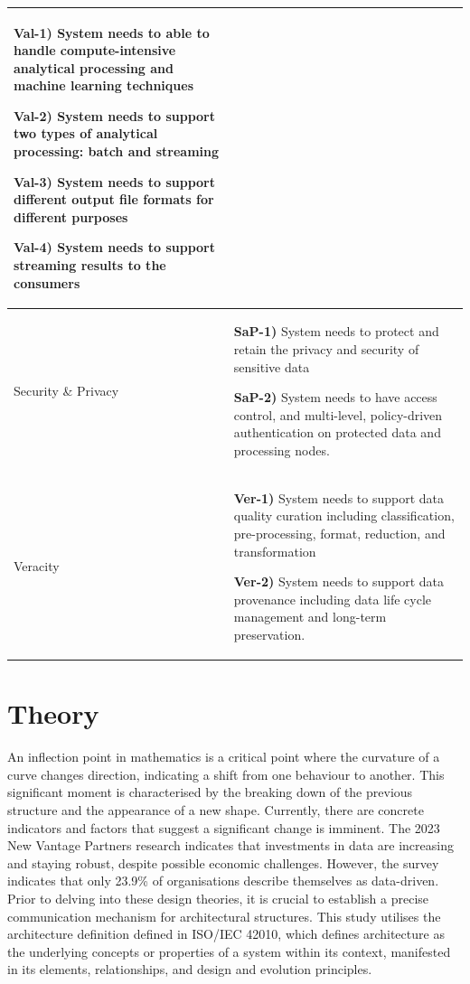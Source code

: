 \documentclass[preprint,12pt]{elsarticle}
\begin{document}
\begin{longtable}{|m{1.4cm}|m{12cm}|}
          \textbf{Val-1)} System needs to able to handle compute-intensive analytical processing and machine learning techniques 
          
          \textbf{Val-2)} System needs to support two types of analytical processing: batch and streaming
          
          \textbf{Val-3)} System needs to support different output file formats for different purposes 
          
          \textbf{Val-4)} System needs to support streaming results to the consumers 
          \\
  
          \hline
  
          Security \& Privacy & 
          
          \textbf{SaP-1)} System needs to protect and retain the privacy and security of sensitive data 
          
          \textbf{SaP-2)} System needs to have access control, and multi-level, policy-driven authentication on protected data and processing nodes. 
          \\
  
          \hline
          
          Veracity &
          
          \textbf{Ver-1)} System needs to support data quality curation including classification, pre-processing, format, reduction, and  transformation 
          
          \textbf{Ver-2)} System needs to support data provenance including data life cycle management and long-term preservation.
          \\
          \hline
  
  \end{longtable}


\section{Theory}
\label{sec:theory}

An inflection point in mathematics is a critical point where the curvature of a curve changes direction, indicating a shift from one behaviour to another. This significant moment is characterised by the breaking down of the previous structure and the appearance of a new shape. Currently, there are concrete indicators and factors that suggest a significant change is imminent. The 2023 New Vantage Partners research indicates that investments in data are increasing and staying robust, despite possible economic challenges. However, the survey indicates that only 23.9\% of organisations describe themselves as data-driven. Prior to delving into these design theories, it is crucial to establish a precise communication mechanism for architectural structures. This study utilises the architecture definition defined in ISO/IEC 42010, which defines architecture as the underlying concepts or properties of a system within its context, manifested in its elements, relationships, and design and evolution principles.
\end{document}
